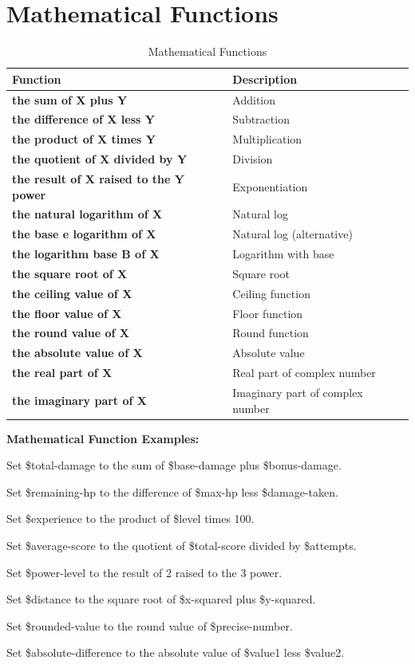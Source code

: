 \documentclass[11pt,letterpaper,oldstylefigures]{memoir}
\newcommand{\stagedir}[1]{#1\par\vspace{1\baselineskip}}
\newenvironment{FountainExample}
  {\begingroup
  \ttfamily\small
   \setlength{\parindent}{0pt}
  \setlength{\parskip}{0.5em}
  \allowdisplaybreaks
  \setlength{\displaywidowpenalty}{0}
  \setlength{\widowpenalty}{0}
  \setlength{\clubpenalty}{0}
  \setlength{\interlinepenalty}{0}
}
  {\endgroup}
\newcommand{\fountain}[1]{\textbf{#1}}
\begin{document}
\section{Mathematical Functions}
\begin{table}[h]
\centering
\begin{tabular}{|l|l|}
\hline
\textbf{Function} & \textbf{Description} \\
\hline
\fountain{the sum of X plus Y} & Addition \\
\fountain{the difference of X less Y} & Subtraction \\
\fountain{the product of X times Y} & Multiplication \\
\fountain{the quotient of X divided by Y} & Division \\
\fountain{the result of X raised to the Y power} & Exponentiation \\
\fountain{the natural logarithm of X} & Natural log \\
\fountain{the base e logarithm of X} & Natural log (alternative) \\
\fountain{the logarithm base B of X} & Logarithm with base \\
\fountain{the square root of X} & Square root \\
\fountain{the ceiling value of X} & Ceiling function \\
\fountain{the floor value of X} & Floor function \\
\fountain{the round value of X} & Round function \\
\fountain{the absolute value of X} & Absolute value \\
\fountain{the real part of X} & Real part of complex number \\
\fountain{the imaginary part of X} & Imaginary part of complex number \\
\hline
\end{tabular}
\caption{Mathematical Functions}
\end{table}

\textbf{Mathematical Function Examples:}
\begin{FountainExample}
\stagedir{Set \$total-damage to the sum of \$base-damage plus \$bonus-damage.}
\stagedir{Set \$remaining-hp to the difference of \$max-hp less \$damage-taken.}
\stagedir{Set \$experience to the product of \$level times 100.}
\stagedir{Set \$average-score to the quotient of \$total-score divided by \$attempts.}
\stagedir{Set \$power-level to the result of 2 raised to the 3 power.}
\stagedir{Set \$distance to the square root of \$x-squared plus \$y-squared.}
\stagedir{Set \$rounded-value to the round value of \$precise-number.}
\stagedir{Set \$absolute-difference to the absolute value of \$value1 less \$value2.}
\end{FountainExample}
\end{document}
